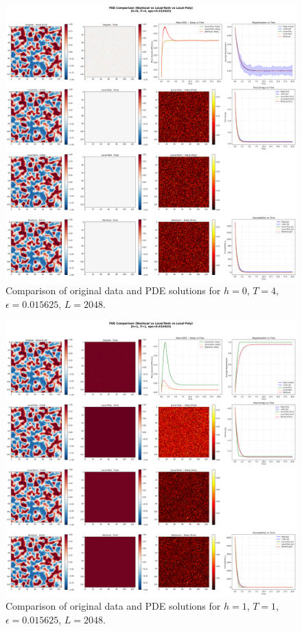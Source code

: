\documentclass[11pt,a4paper]{article}
\begin{document}
\begin{figure}[!h]
    \centering
    \includegraphics[width=1.0\textwidth]{fig/compare_pde_solvers_L2048_h0_T4_eps0.015625.png}
    \caption{Comparison of original data and PDE solutions for $h=0$, $T=4$, $\epsilon=0.015625$, $L=2048$.}
    \label{fig:pde_comparison_h0_T4_eps0.015625_L2048}
\end{figure}


\begin{figure}[!h]
    \centering
    \includegraphics[width=1.0\textwidth]{fig/compare_pde_solvers_L2048_h1_T1_eps0.015625.png}
    \caption{Comparison of original data and PDE solutions for $h=1$, $T=1$, $\epsilon=0.015625$, $L=2048$.}
    \label{fig:pde_comparison_h1_T1_eps0.015625_L2048}
\end{figure}
\end{document}
